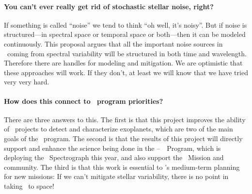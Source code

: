 \documentclass[12pt, letterpaper]{article}
\begin{document}
\paragraph{You can't ever really get rid of stochastic stellar noise, right?}
If something is called ``noise'' we tend to think ``oh well, it's
noisy''. But if noise is structured---in spectral space or temporal
space or both---then it can be modeled continuously.
This proposal argues that all the important noise sources in \EPRV\ coming
from spectral variability will be structured in both time and wavelength.
Therefore there are handles for modeling and mitigation.
We are optimistic that these approaches will work.
If they don't, at least we will know that we have tried very very hard.

\paragraph{How does this connect to \XRP\ program priorities?}
There are three answers to this. The first is that this project
improves the ability of \EPRV\ projects to detect and characterize
exoplanets, which are two of the main goals of the \XRP\ program.
The second is that the results of this project will directly support
and enhance the science being done in the \NASA--\NSF\ \NNEXPLORE\ Program,
which is deploying the \NEID\ Spectrograph this year,
and also support the \TESS\ Mission and community.
The third is that this work is essential to \NASA's medium-term planning
for new missions: If we can't mitigate stellar variability, there is no
point in taking \EPRV\ to space!

\clearpage

\raggedright
\end{document}

